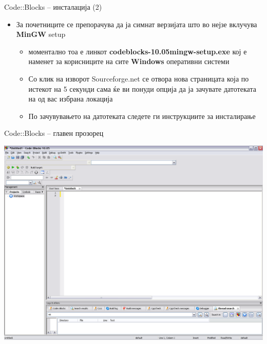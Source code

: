 \begin{frame}{Code::Blocks – инсталација (2)}
\begin{itemize}
  \item За почетниците се препорачува да ја симнат верзијата што во нејзе
  вклучува \textbf{MinGW} setup
    \begin{itemize}
  \item моментално тоа е линкот \textbf{codeblocks-10.05mingw-setup.exe} кој е наменет за
  корисниците на сите \textbf{Windows} оперативни системи
  \item Со клик на изворот Sourceforge.net се отвора нова страницата која по
  истекот на 5 секунди сама ќе ви понуди опција да ја зачувате датотеката на од вас избрана локација
  \item По зачувувањето на датотеката следете ги инструкциите за инсталирање
    \end{itemize}
\end{itemize}
\end{frame}

\begin{frame}{Code::Blocks – главен прозорец}
\begin{center}
\includegraphics[scale=0.26]{images/cb_main}
\end{center}
\end{frame}

